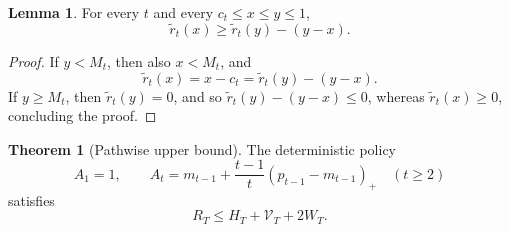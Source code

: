 \documentclass[11pt]{article}
\theoremstyle{definition}
\newtheorem{theorem}{Theorem}
\newtheorem{lemma}{Lemma}
\begin{document}
\begin{lemma}
\label{lem:surrogate-one-sided-lipschitz}
For every $t$ and every $c_t\le x\le y\le1$,
\[
    \widetilde r_t(x)
    \ge
    \widetilde r_t(y)-(y-x).
\]
\end{lemma}

\begin{proof}
If $y<M_t$, then also $x<M_t$, and
\[
    \widetilde r_t(x)
    =
    x-c_t
    =
    \widetilde r_t(y)-(y-x).
\]
If $y\ge M_t$, then $\widetilde r_t(y)=0$, and so
$\widetilde r_t(y)-(y-x)\le0$, whereas
$\widetilde r_t(x)\ge0$, concluding the proof.
\end{proof}

\begin{theorem}[Pathwise upper bound]
\label{thm:pathwise-upper-bound}
The deterministic policy
\[
    A_1=1,
    \qquad
    A_t
    =
    m_{t-1}
    +
    \frac{t-1}{t}(p_{t-1}-m_{t-1})_+
    \quad(t\ge2)
\]
satisfies
\[
    R_T\le H_T+\mathcal{V}_T+2W_T.
\]
\end{theorem}
\end{document}
